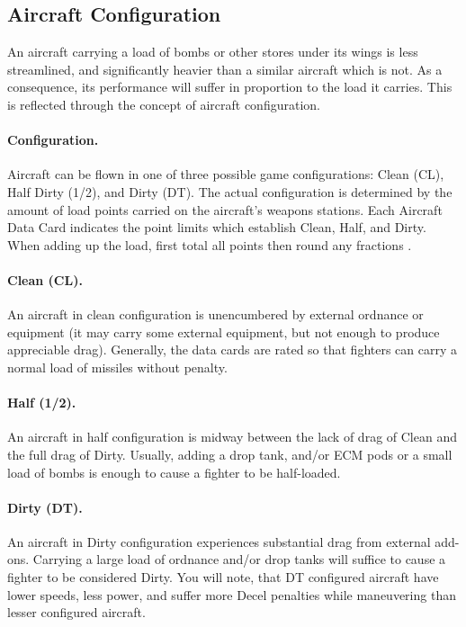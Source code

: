 \begin{advancedrules}

\section{Aircraft Configuration}
\label{rule:aircraft-configuration}

An aircraft carrying a load of bombs or other stores under its wings is less streamlined, and significantly heavier than a similar aircraft which is not. As a consequence, its performance will suffer in proportion to the load it carries. This is reflected through the concept of aircraft configuration.

\paragraph{Configuration.} 
Aircraft can be flown in one of three possible game configurations: Clean (CL), Half Dirty (1/2), and Dirty (DT). The actual configuration is determined by the amount of load points carried on the aircraft's weapons stations.  Each Aircraft Data Card indicates the point limits which establish Clean, Half, and Dirty. When adding up the load, first total all points then round any fractions .

\paragraph{Clean (CL).} 
An aircraft in clean configuration is unencumbered by external ordnance or equipment (it may carry some external equipment, but not enough to produce appreciable drag). Generally, the data cards are rated so that fighters can carry a normal load of missiles without penalty.

\paragraph{Half (1/2).} 
An aircraft in half configuration is midway between the lack of drag of Clean and the full drag of Dirty. Usually, adding a drop tank, and/or ECM pods or a small load of bombs is enough to cause a fighter to be half-loaded.

\paragraph{Dirty (DT).} 
An aircraft in Dirty configuration experiences substantial drag from external add-ons. Carrying a large load of ordnance and/or drop tanks will suffice to cause a fighter to be considered Dirty. You will note, that DT configured aircraft have lower speeds, less power, and suffer more Decel penalties while maneuvering than lesser configured aircraft.


\end{advancedrules}
